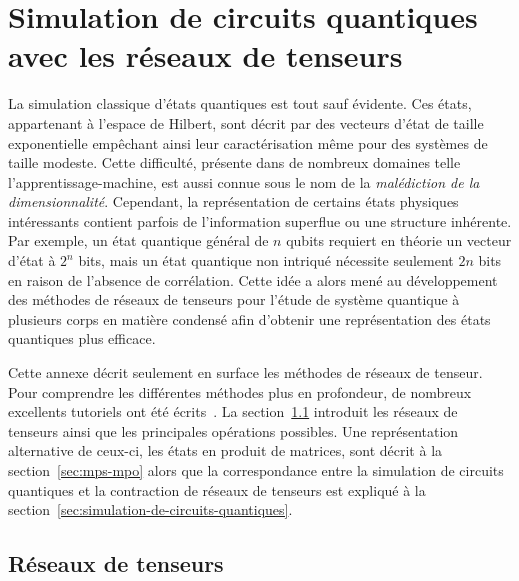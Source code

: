 \chapter{Simulation de circuits quantiques avec les réseaux de tenseurs}
\label{ann:simulation-circuits-quantiques-avec-reseaux-de-tenseurs}

La simulation classique d'états quantiques est tout sauf évidente. Ces états, appartenant à l'espace de Hilbert, sont décrit par des vecteurs d'état de taille exponentielle empêchant ainsi leur caractérisation même pour des systèmes de taille modeste. Cette difficulté, présente dans de nombreux domaines telle l'apprentissage-machine, est aussi connue sous le nom de la \textit{malédiction de la dimensionnalité}. Cependant, la représentation de certains états physiques intéressants contient parfois de l'information superflue ou une structure inhérente. Par exemple, un état quantique général de $n$ qubits requiert en théorie un vecteur d'état à $2^{n}$ bits, mais un état quantique non intriqué nécessite seulement $2n$ bits en raison de l'absence de corrélation. Cette idée a alors mené au développement des méthodes de réseaux de tenseurs pour l'étude de système quantique à plusieurs corps en matière condensé afin d'obtenir une représentation des états quantiques plus efficace. 

Cette annexe décrit seulement en surface les méthodes de réseaux de tenseur. Pour comprendre les différentes méthodes plus en profondeur, de nombreux excellents tutoriels ont été écrits~\cite{bridgemanHandwavingInterpretiveDance2017,biamonteTensorNetworksNutshell2017,bakerMethodesCalculAvec2021}. La section~\ref{sec:reseaux-de-tenseurs} introduit les réseaux de tenseurs ainsi que les principales opérations possibles. Une représentation alternative de ceux-ci, les états en produit de matrices, sont décrit à la section~\ref{sec:mps-mpo} alors que la correspondance entre la simulation de circuits quantiques et la contraction de réseaux de tenseurs est expliqué à la section~\ref{sec:simulation-de-circuits-quantiques}.


\section{Réseaux de tenseurs}
\label{sec:reseaux-de-tenseurs}

